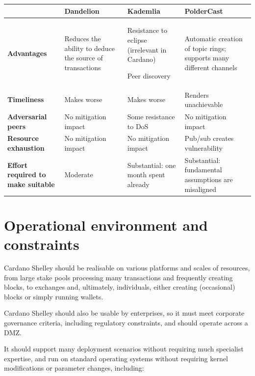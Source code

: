 \documentclass[11pt,a4paper]{article}
\begin{document}
\begin{longtable}[]{p{3cm}p{4cm}p{4cm}p{4cm}}
\toprule
& \textbf{Dandelion} & \textbf{Kademlia} &
\textbf{PolderCast}\tabularnewline
\midrule
\endhead
\begin{minipage}[t]{0.22\columnwidth}\raggedright
\textbf{Advantages}\strut
\end{minipage} & \begin{minipage}[t]{0.22\columnwidth}\raggedright
Reduces the ability to deduce the source of transactions\strut
\end{minipage} & \begin{minipage}[t]{0.22\columnwidth}\raggedright
Resistance to eclipse (irrelevant in Cardano)

Peer discovery\strut
\end{minipage} & \begin{minipage}[t]{0.22\columnwidth}\raggedright
Automatic creation of topic rings; supports many different
channels\strut
\end{minipage}\tabularnewline
\textbf{Timeliness} & Makes worse & Makes worse & Renders
unachievable\tabularnewline
\textbf{Adversarial peers} & No mitigation impact & Some resistance to
DoS & No mitigation impact\tabularnewline
\textbf{Resource exhaustion} & No mitigation impact & No mitigation
impact & Pub/sub creates vulnerability\tabularnewline
\textbf{Effort required to make suitable} & Moderate & Substantial: one
month spent already & Substantial: fundamental assumptions are
misaligned\tabularnewline
\bottomrule
\end{longtable}

\section{Operational environment and constraints}
\label{operational-environment-and-constraints}

Cardano Shelley should be realisable on various platforms and scales of
resources, from large stake pools processing many transactions and
frequently creating blocks, to exchanges and, ultimately, individuals,
either creating (occasional) blocks or simply running wallets.

Cardano Shelley should also be usable by enterprises, so it must meet
corporate governance criteria, including regulatory constraints, and
should operate across a DMZ.

It should support many deployment scenarios without requiring much
specialist expertise, and run on standard operating systems without
requiring kernel modifications or parameter changes, including:
\end{document}

